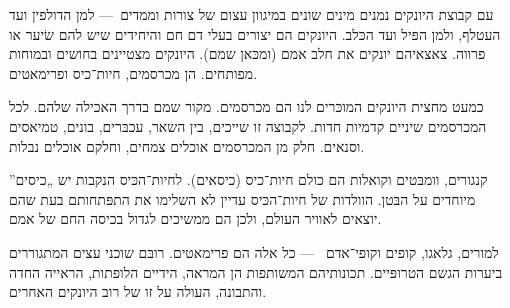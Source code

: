 
עם קבוצת היונקים נמנים מינים שונים במיגוון עצום של צורות וממדים~— למן הדולפין ועד העטלף, ולמן הפּיל ועד הכּלב. היונקים הם יצורים בעלי דם חם והיחידים שיש להם שׂיער או פרווה. צאצאיהם יונקים את חלב אמם (ומכּאן שמם). היונקים מצטיינים בחושים ובמוחות מפותחים.  הן מכרסמים, חיות־כיס ופרימאטים.



כמעט מחצית היונקים המוכּרים לנו הם מכרסמים. מקור שמם בדרך האכילה שלהם. לכל המכרסמים שיניים קדמיות חדות. לקבוצה זו שייכים, בין השאר, עכבּרים, בונים, טמיאסים וסנאים. חלק מן המכרסמים אוכלים צמחים, וחלקם אוכלים נבלות.



קנגורים, וומבּטים וקואלות הם כולם חיות־כיס (כיסאים). לחיות־הכּיס הנקבות יש „כיסים” מיוחדים על הבּטן. הוולדות של חיות־הכּיס עדיין לא השלימו את התפּתחותם בעת שהם יוצאים לאוויר העולם, ולכן הם ממשיכים לגדול בכיסה החם של אמם.



למורים, גלאגו, קופים וקופי־אדם ~— כל אלה הם פרימאטים. רובּם שוכני עצים המתגוררים ביערות הגשם הטרופּיים. תכונותיהם המשותפות הן המראה, הידיים הלופתות, הראייה החדה והתבונה, העולה על זו של רוב היונקים האחרים.
